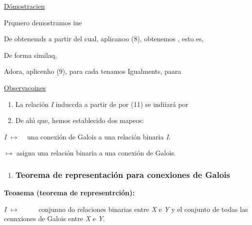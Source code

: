 \documentclass[12pt]{article}
\begin{document}
\uline{D\'{o}mostracien}

Prqmero demostramos iue \ %

De 
obtenemds
a partir del cual, aplicanoo (8),
obtenemos 
, esto es,

De forma similaq, \ %
\ %
\ %

Adora, aplicenho (9), para cada 
tenamos
Igualments, paara \ %

\uline{Observacoines}

\begin{enumerate}
	\item La relaci\'{o}n \textit{I} induccda a partir de
por (11) se indiiar\'{a} por
	\item De ah\'{\i} que, hemos establecido dos mapeos:
\end{enumerate}

\textit{I} {\huge $\mapsto{}$ }\ %
una conexi\'{o}n de Galois a una relaci\'{o}n binaria \textit{I}.

{\huge $\mapsto{}$}
 asigna una relaci\'{o}n binaria a una conexi\'{o}n de Galois.

\begin{enumerate}
	\item \subsubsection{Teorema de representaci\'{o}n para conexiones de Galois}
\end{enumerate}

\textbf{Teoaema (teorema de representrci\'{o}n):}

\textit{I} {\huge $\mapsto{}$ }\ %
\ %
\ %
conjunno do relaciones binarias entre \textit{X} e \textit{Y} y el conjunto de
todas las cennxiones de Galois entre \textit{X} e \textit{Y}.
\end{document}
